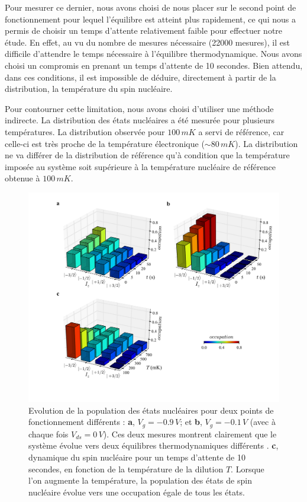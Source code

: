 Pour mesurer ce dernier, nous avons choisi de nous placer sur le second point de fonctionnement pour lequel l'équilibre est atteint plus rapidement, ce qui nous  a permis de choisir un temps d'attente relativement faible pour effectuer notre étude. En effet, au vu du nombre de mesures nécessaire (22000 mesures), il est difficile d'attendre le temps nécessaire à l'équilibre thermodynamique. Nous avons choisi un compromis en prenant un temps d'attente de 10 secondes. Bien attendu, dans ces conditions, il est impossible de déduire, directement à partir de la distribution, la température du spin nucléaire.

Pour contourner cette limitation, nous avons choisi d'utiliser une méthode indirecte. La distribution des états nucléaires a été mesurée pour plusieurs températures. La distribution observée pour $100\,mK$ a servi de référence, car celle-ci est très proche de la température électronique ($\sim 80\,mK$). La distribution ne va différer de la distribution de référence qu'à condition que la température imposée au système soit supérieure à la température nucléaire de référence obtenue à $100\,mK$.

\begin{figure}[h!]
\includegraphics[scale=0.45]{Resultats/SpinTemp/SpinTemp.pdf} 
\caption{Evolution de la population des états nucléaires pour deux points de fonctionnement différents : \textbf{a}, $V_g = -0.9\,V$; et \textbf{b}, $V_g = -0.1\,V$ (avec à chaque fois $V_{ds} = 0\,V$). Ces deux mesures montrent clairement que le système évolue vers deux équilibres thermodynamiques différents . \textbf{c}, dynamique du spin nucléaire pour un temps d'attente de 10 secondes, en fonction de la température de la dilution $T$. Lorsque l'on augmente la température, la population des états de spin nucléaire évolue vers une occupation égale de tous les états.}
\label{dynamique_spin}
\end{figure}


